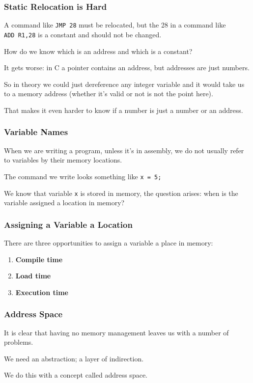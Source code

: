 \begin{frame}
\frametitle{Static Relocation is Hard}

A command like \texttt{JMP 28} must be relocated, but the 28 in a command like \texttt{ADD~R1,28} is a constant and should not be changed. 

How do we know which is an address and which is a constant? 

It gets worse: in C a pointer contains an address, but addresses are just numbers. 

So in theory we could just dereference any integer variable and it would take us to a memory address (whether it's valid or not is not the point here). 

That makes it even harder to know if a number is just a number or an address.


\end{frame}

\begin{frame}
\frametitle{Variable Names}

When we are writing a program, unless it's in assembly, we do not usually refer to variables by their memory locations.

The command we write looks something like \texttt{x = 5;} 

We know that variable \texttt{x} is stored in memory, the question arises: when is the variable assigned a location in memory?


\end{frame}

\begin{frame}
\frametitle{Assigning a Variable a Location}

There are three opportunities to assign a variable a place in memory:

\begin{enumerate}
	\item \textbf{Compile time}
	\item \textbf{Load time}
	\item \textbf{Execution time}
\end{enumerate}


\end{frame}

\begin{frame}
\frametitle{Address Space}

It is clear that having no memory management leaves us with a number of problems. 

We need an abstraction; a layer of indirection. 

We do this with a concept called \alert{address space}. 


\end{frame}

